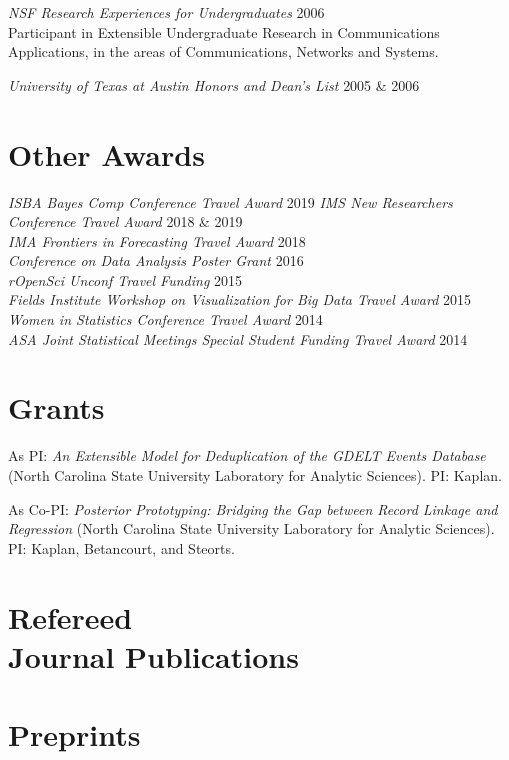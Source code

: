 \documentclass[margin,line]{res}
\begin{document}
\begin{resume}
{\em NSF Research Experiences for Undergraduates } \hfill 2006\\
Participant in Extensible Undergraduate Research in Communications Applications, in the areas of Communications, Networks and Systems.

{\em University of Texas at Austin Honors and Dean's List } \hfill 2005 \& 2006

\section{\sc Other Awards}
{\em ISBA Bayes Comp Conference Travel Award} \hfill 2019
{\em IMS New Researchers Conference Travel Award} \hfill 2018 \& 2019 \\
{\em IMA Frontiers in Forecasting Travel Award} \hfill 2018\\
{\em Conference on Data Analysis Poster Grant } \hfill 2016\\
{\em rOpenSci Unconf Travel Funding } \hfill 2015\\
{\em Fields Institute Workshop on Visualization for Big Data Travel Award } \hfill 2015\\
{\em Women in Statistics Conference Travel Award } \hfill 2014\\
{\em ASA Joint Statistical Meetings Special Student Funding Travel Award } \hfill 2014

\section{\sc Grants}
As PI: {\em An Extensible Model for Deduplication of the GDELT Events Database} (North Carolina State University Laboratory for Analytic Sciences). PI: Kaplan.

As Co-PI: {\em Posterior Prototyping: Bridging the Gap between Record Linkage and Regression} (North Carolina State University Laboratory for Analytic Sciences). PI: Kaplan, Betancourt, and Steorts.

\section{\sc Refereed \\ Journal Publications}
\printbibliography[keyword=refereed, heading=none, resetnumbers=true]

\section{\sc Preprints}
\printbibliography[keyword=submitted, heading=none, resetnumbers=false]


\end{resume}
\end{document}
